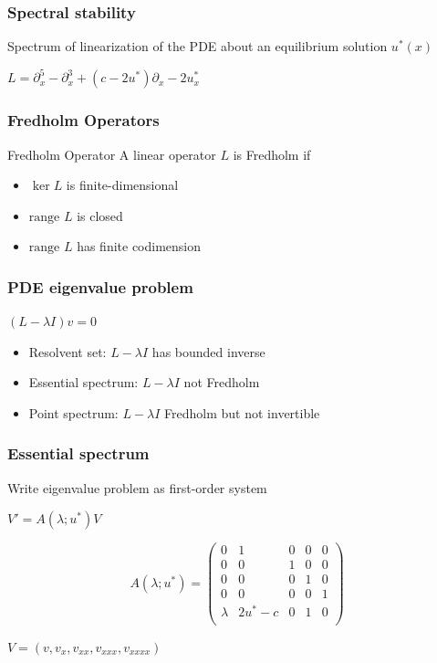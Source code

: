 \documentclass[16pt]{beamer}
\begin{document}
\begin{frame}
	\frametitle{Spectral stability}
	\fontsize{16}{7.2}\selectfont
	Spectrum of linearization of the PDE about an equilibrium solution $u^*(x)$

	\begin{center}
		$L = \partial_x^5 - \partial_x^3 + (c - 2 u^*)\partial_x - 2 u^*_x $
	\end{center}
\end{frame}

\begin{frame}
	\frametitle{Fredholm Operators}
	\fontsize{16}{7.2}\selectfont
	\begin{block}{Fredholm Operator}
	A linear operator $L$ is Fredholm if
	\begin{itemize}
	\item $\ker L$ is finite-dimensional
	\item $\text{range } L$ is closed
	\item $\text{range } L$ has finite codimension
	\end{itemize}
	\end{block}
\end{frame}

\begin{frame}
	\frametitle{PDE eigenvalue problem}
	\fontsize{16}{7.2}\selectfont
	\begin{center}
		$(L - \lambda I )v = 0$
	\end{center}
	\begin{itemize}
	\item Resolvent set: $L - \lambda I$ has bounded inverse
	\vspace{0.5cm}
	\item Essential spectrum: $L - \lambda I$ not Fredholm
	\vspace{0.5cm}
	\item Point spectrum: $L - \lambda I$ Fredholm but not invertible
	\end{itemize}
\end{frame}

\begin{frame}
	\frametitle{Essential spectrum}
	\fontsize{16}{7.2}\selectfont
	Write eigenvalue problem as first-order system
	\begin{center}
		$V' = A(\lambda; u^*)V$
	\end{center}
	\begin{center}
	\[
		A(\lambda;u^*) = 
		\begin{pmatrix}
		0 & 1 & 0 & 0 & 0\\
		0 & 0 & 1 & 0 & 0\\
		0 & 0 & 0 & 1 & 0\\
		0 & 0 & 0 & 0 & 1\\
		\lambda & 2u^* - c & 0 & 1 & 0 \\ 
		\end{pmatrix}
	\]
	\end{center}
	\begin{center}
		$V = (v,v_x, v_{xx}, v_{xxx},v_{xxxx})$
	\end{center}
\end{frame}
\end{document}
